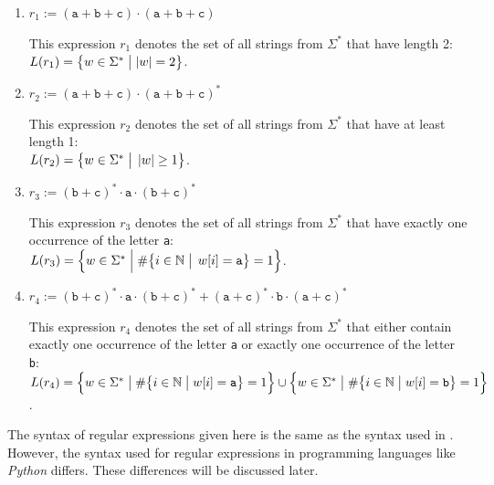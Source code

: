 \begin{enumerate}
\item $ r_1 := (\texttt{a} + \texttt{b} + \texttt{c}) \cdot (\texttt{a} + \texttt{b} + \texttt{c}) $

      This expression $ r_1 $ denotes the set of all strings from $\Sigma^*$ that have length 2:
      \\[0.2cm]
      \hspace*{1.3cm}
      $ L(r_1) = \bigl\{ w \in \Sigma^* \bigm| |w| = 2 \bigr\}$.
\item $ r_2 := (\texttt{a} + \texttt{b} + \texttt{c}) \cdot (\texttt{a} + \texttt{b} + \texttt{c})^* $

      This expression $ r_2 $ denotes the set of all strings from $\Sigma^*$ that have at least length 1:
      \\[0.2cm]
      \hspace*{1.3cm}
      $L(r_2) = \bigl\{ w \in \Sigma^* \bigm|\, |w| \geq 1 \bigr\}$.
\item $ r_3 := (\texttt{b} + \texttt{c})^* \cdot \texttt{a} \cdot (\texttt{b} + \texttt{c})^* $

      This expression $ r_3 $ denotes the set of all strings from $\Sigma^*$ that have exactly one occurrence of the letter \texttt{a}:
      \\[0.2cm]
      \hspace*{1.3cm}
      $L(r_3) = \Bigl\{ w \in \Sigma^* \Bigm| \#\bigl\{i \in \mathbb{N} \bigm|\, w[i] = \texttt{a} \bigr\} = 1 \Bigr\}$. 
\item $ r_4 :=  (\texttt{b} + \texttt{c})^* \cdot \texttt{a} \cdot (\texttt{b} + \texttt{c})^* + (\texttt{a} + \texttt{c})^* \cdot \texttt{b} \cdot (\texttt{a} + \texttt{c})^* $

      This expression $ r_4 $ denotes the set of all strings from $\Sigma^*$ that either contain exactly one
      occurrence of the letter \texttt{a} or exactly one occurrence of the letter \texttt{b}: 
      \\[0.2cm]
      \hspace*{1.3cm}
      $L(r_4) = \Bigl\{ w \in \Sigma^* \bigm| \#\bigl\{i \in \mathbb{N} \bigm| w[i] = \texttt{a} \bigr\} = 1
      \Bigr\} \cup \Bigl\{ w \in \Sigma^* \bigm| \#\bigl\{i \in \mathbb{N} \bigm| w[i] = \texttt{b} \bigr\} = 1
      \Bigr\}$.  \eox
\end{enumerate}

\remarkEng
The syntax of regular expressions given here is the same as the syntax used in \cite{hopcroft:06}. However, the
syntax used for regular expressions in programming languages like \textsl{Python} differs. These differences
will be discussed later. 
\eox


